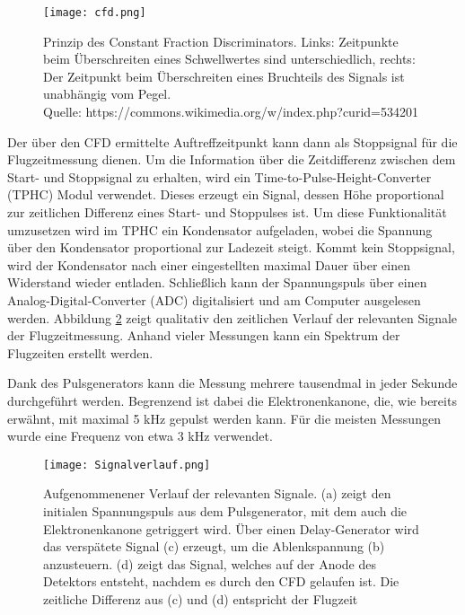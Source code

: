 \begin{figure}
    \centering
    \texttt{[image: cfd.png]}
    \caption[Prinzip des Constant Fraction Discriminators]{Prinzip des Constant Fraction Discriminators. Links: Zeitpunkte beim Überschreiten eines Schwellwertes sind unterschiedlich, rechts: Der Zeitpunkt beim Überschreiten eines Bruchteils des Signals ist unabhängig vom Pegel.\\
    \small Quelle: https://commons.wikimedia.org/w/index.php?curid=534201}
    \label{fig:CFD} 
\end{figure}

Der über den CFD ermittelte Auftreffzeitpunkt kann dann als Stoppsignal für die Flugzeitmessung dienen. Um die Information über die Zeitdifferenz zwischen dem Start- und Stoppsignal zu erhalten, wird ein Time-to-Pulse-Height-Converter (TPHC) Modul verwendet. Dieses erzeugt ein Signal, dessen Höhe proportional zur zeitlichen Differenz eines Start- und Stoppulses ist. Um diese Funktionalität umzusetzen wird im TPHC ein Kondensator aufgeladen, wobei die Spannung über den Kondensator proportional zur Ladezeit steigt. Kommt kein Stoppsignal, wird der Kondensator nach einer eingestellten maximal Dauer über einen Widerstand wieder entladen. Schließlich kann der Spannungspuls über einen Analog-Digital-Converter (ADC) digitalisiert und am Computer ausgelesen werden. Abbildung \ref{fig:Signal} zeigt qualitativ den zeitlichen Verlauf der relevanten Signale der Flugzeitmessung. Anhand vieler Messungen kann ein Spektrum der Flugzeiten erstellt werden.

Dank des Pulsgenerators kann die Messung mehrere tausendmal in jeder Sekunde durchgeführt werden. Begrenzend ist dabei die Elektronenkanone, die, wie bereits erwähnt, mit maximal 5 kHz gepulst werden kann. Für die meisten Messungen wurde eine Frequenz von etwa 3 kHz verwendet.

\begin{figure}
    \centering
    \texttt{[image: Signalverlauf.png]}
    \caption[Aufgenommenener Verlauf der relevanten Signale der ToF-Messung]{Aufgenommenener Verlauf der relevanten Signale. (a) zeigt den initialen Spannungspuls aus dem Pulsgenerator, mit dem auch die Elektronenkanone getriggert wird. Über einen Delay-Generator wird das verspätete Signal (c) erzeugt, um die Ablenkspannung (b) anzusteuern. (d) zeigt das Signal, welches auf der Anode des Detektors entsteht, nachdem es durch den CFD gelaufen ist. Die zeitliche Differenz aus (c) und (d) entspricht der Flugzeit}
    \label{fig:Signal} 
\end{figure}

